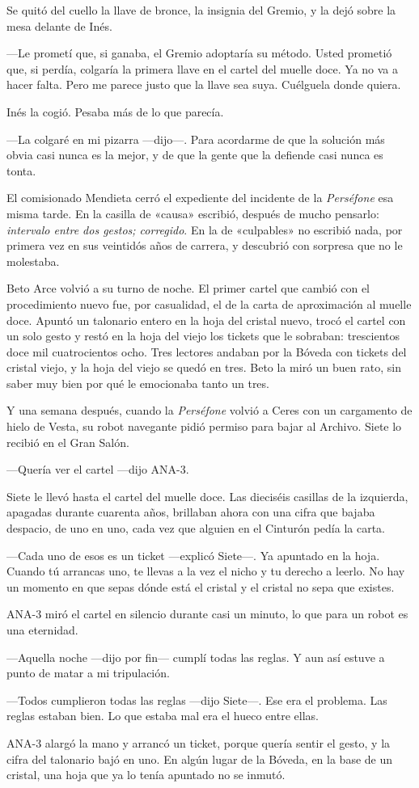 Se quitó del cuello la llave de bronce, la insignia del Gremio, y la dejó sobre la mesa delante de Inés.

---Le prometí que, si ganaba, el Gremio adoptaría su método. Usted prometió que, si perdía, colgaría la primera llave en el cartel del muelle doce. Ya no va a hacer falta. Pero me parece justo que la llave sea suya. Cuélguela donde quiera.

Inés la cogió. Pesaba más de lo que parecía.

---La colgaré en mi pizarra ---dijo---\nobreak. Para acordarme de que la solución más obvia casi nunca es la mejor, y de que la gente que la defiende casi nunca es tonta.

\escena
El comisionado Mendieta cerró el expediente del incidente de la \emph{Perséfone} esa misma tarde. En la casilla de «causa» escribió, después de mucho pensarlo: \emph{intervalo entre dos gestos; corregido}. En la de «culpables» no escribió nada, por primera vez en sus veintidós años de carrera, y descubrió con sorpresa que no le molestaba.

Beto Arce volvió a su turno de noche. El primer cartel que cambió con el procedimiento nuevo fue, por casualidad, el de la carta de aproximación al muelle doce. Apuntó un talonario entero en la hoja del cristal nuevo, trocó el cartel con un solo gesto y restó en la hoja del viejo los tickets que le sobraban: trescientos doce mil cuatrocientos ocho. Tres lectores andaban por la Bóveda con tickets del cristal viejo, y la hoja del viejo se quedó en tres. Beto la miró un buen rato, sin saber muy bien por qué le emocionaba tanto un tres.

Y una semana después, cuando la \emph{Perséfone} volvió a Ceres con un cargamento de hielo de Vesta, su robot navegante pidió permiso para bajar al Archivo. Siete lo recibió en el Gran Salón.

---Quería ver el cartel ---dijo ANA-3.

Siete le llevó hasta el cartel del muelle doce. Las dieciséis casillas de la izquierda, apagadas durante cuarenta años, brillaban ahora con una cifra que bajaba despacio, de uno en uno, cada vez que alguien en el Cinturón pedía la carta.

---Cada uno de esos es un ticket ---explicó Siete---\nobreak. Ya apuntado en la hoja. Cuando tú arrancas uno, te llevas a la vez el nicho y tu derecho a leerlo. No hay un momento en que sepas dónde está el cristal y el cristal no sepa que existes.

ANA-3 miró el cartel en silencio durante casi un minuto, lo que para un robot es una eternidad.

---Aquella noche ---dijo por fin--- cumplí todas las reglas. Y aun así estuve a punto de matar a mi tripulación.

---Todos cumplieron todas las reglas ---dijo Siete---\nobreak. Ese era el problema. Las reglas estaban bien. Lo que estaba mal era el hueco entre ellas.

ANA-3 alargó la mano y arrancó un ticket, porque quería sentir el gesto, y la cifra del talonario bajó en uno. En algún lugar de la Bóveda, en la base de un cristal, una hoja que ya lo tenía apuntado no se inmutó.
